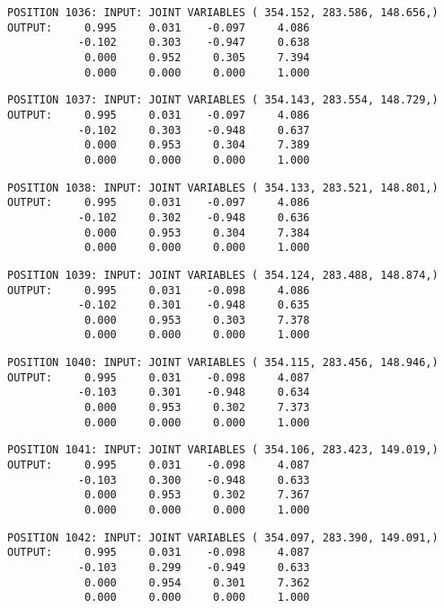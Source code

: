 \begin{verbatim}
POSITION 1036: INPUT: JOINT VARIABLES ( 354.152, 283.586, 148.656,)
OUTPUT:     0.995     0.031    -0.097     4.086
           -0.102     0.303    -0.947     0.638
            0.000     0.952     0.305     7.394
            0.000     0.000     0.000     1.000
\end{verbatim} \pagebreak[1]\begin{verbatim}
POSITION 1037: INPUT: JOINT VARIABLES ( 354.143, 283.554, 148.729,)
OUTPUT:     0.995     0.031    -0.097     4.086
           -0.102     0.303    -0.948     0.637
            0.000     0.953     0.304     7.389
            0.000     0.000     0.000     1.000
\end{verbatim} \pagebreak[1]\begin{verbatim}
POSITION 1038: INPUT: JOINT VARIABLES ( 354.133, 283.521, 148.801,)
OUTPUT:     0.995     0.031    -0.097     4.086
           -0.102     0.302    -0.948     0.636
            0.000     0.953     0.304     7.384
            0.000     0.000     0.000     1.000
\end{verbatim} \pagebreak[1]\begin{verbatim}
POSITION 1039: INPUT: JOINT VARIABLES ( 354.124, 283.488, 148.874,)
OUTPUT:     0.995     0.031    -0.098     4.086
           -0.102     0.301    -0.948     0.635
            0.000     0.953     0.303     7.378
            0.000     0.000     0.000     1.000
\end{verbatim} \pagebreak[1]\begin{verbatim}
POSITION 1040: INPUT: JOINT VARIABLES ( 354.115, 283.456, 148.946,)
OUTPUT:     0.995     0.031    -0.098     4.087
           -0.103     0.301    -0.948     0.634
            0.000     0.953     0.302     7.373
            0.000     0.000     0.000     1.000
\end{verbatim} \pagebreak[1]\begin{verbatim}
POSITION 1041: INPUT: JOINT VARIABLES ( 354.106, 283.423, 149.019,)
OUTPUT:     0.995     0.031    -0.098     4.087
           -0.103     0.300    -0.948     0.633
            0.000     0.953     0.302     7.367
            0.000     0.000     0.000     1.000
\end{verbatim} \pagebreak[1]\begin{verbatim}
POSITION 1042: INPUT: JOINT VARIABLES ( 354.097, 283.390, 149.091,)
OUTPUT:     0.995     0.031    -0.098     4.087
           -0.103     0.299    -0.949     0.633
            0.000     0.954     0.301     7.362
            0.000     0.000     0.000     1.000
\end{verbatim} \pagebreak[1]\begin{verbatim}

\end{verbatim}
